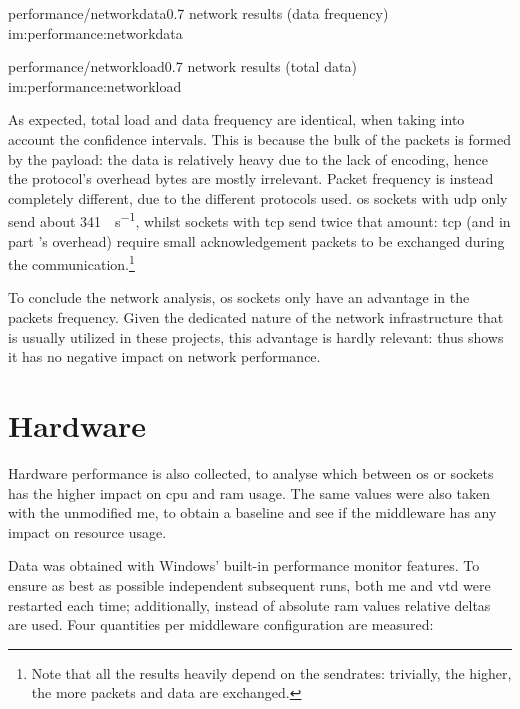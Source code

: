 \begin{image}
	{performance/networkdata}{0.7}
	{network results (data frequency)}
	{im:performance:networkdata}
	{}
\end{image}

\begin{image}
	{performance/networkload}{0.7}
	{network results (total data)}
	{im:performance:networkload}
	{}
\end{image}

As expected, total load and data frequency are identical, when taking into account the confidence intervals. This is because the bulk of the packets is formed by the payload: the data is relatively heavy due to the lack of encoding, hence the protocol's overhead bytes are mostly irrelevant. Packet frequency is instead completely different, due to the different protocols used. \gls{os} sockets with \gls{udp} only send about \SI{341}{\packets\per\second}, whilst  sockets with \gls{tcp} send twice that amount: \gls{tcp} (and in part 's overhead) require small acknowledgement packets to be exchanged during the communication.\footnote{Note that all the results heavily depend on the sendrates: trivially, the higher, the more packets and data are exchanged.}

To conclude the network analysis, \gls{os} sockets only have an advantage in the packets frequency. Given the dedicated nature of the network infrastructure that is usually utilized in these projects, this advantage is hardly relevant:  thus shows it has no negative impact on network performance.

\section{Hardware}\label{sc:performance:hardware}



Hardware performance is also collected, to analyse which between \gls{os} or  sockets has the higher impact on \gls{cpu} and \gls{ram} usage. The same values were also taken with the unmodified \gls{me}, to obtain a baseline and see if the \gls{middleware} has any impact on resource usage.

Data was obtained with Windows' built-in performance monitor features. To ensure as best as possible independent subsequent runs, both \gls{me} and \gls{vtd} were restarted each time; additionally, instead of absolute \gls{ram} values relative deltas are used. Four quantities per \gls{middleware} configuration are measured:

